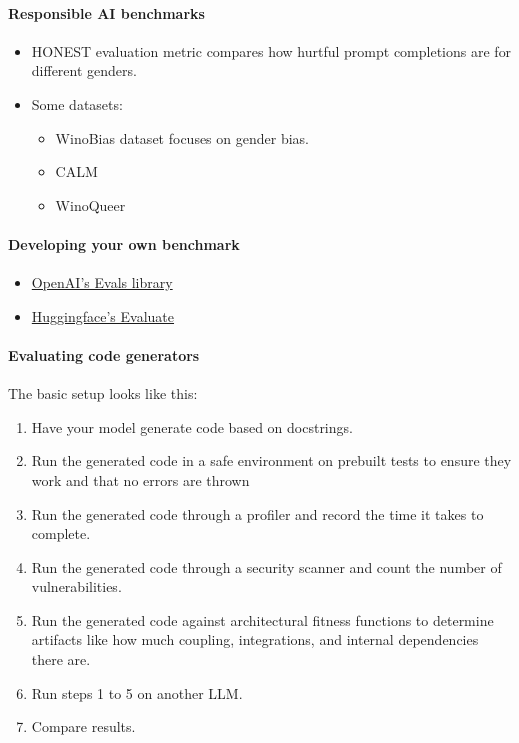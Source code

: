 \paragraph{Responsible AI benchmarks}
\begin{itemize}
	\item HONEST evaluation metric compares how hurtful prompt completions are for different genders. 
	\item Some datasets: 
		\begin{itemize}
			\item WinoBias dataset focuses on gender bias. 
			\item CALM
			\item WinoQueer
		\end{itemize}
\end{itemize}

\paragraph{Developing your own benchmark}
\begin{itemize}
	\item \href{https://github.com/openai/evals}{OpenAI's Evals library} 
	\item \href{https://huggingface.co/docs/evaluate/en/index}{Huggingface's Evaluate}
\end{itemize}

\paragraph{Evaluating code generators}

The basic setup looks like this:
\begin{enumerate}
	\item Have your model generate code based on docstrings.
	\item Run the generated code in a safe environment on prebuilt tests to ensure they work and that no errors are thrown
	\item Run the generated code through a profiler and record the time it takes to complete. 
	\item Run the generated code through a security scanner and count the number of vulnerabilities. 
	\item Run the generated code against architectural fitness functions to determine artifacts like how much coupling, integrations, and internal dependencies there are. 
	\item Run steps 1 to 5 on another LLM.
	\item Compare results. 
\end{enumerate}

